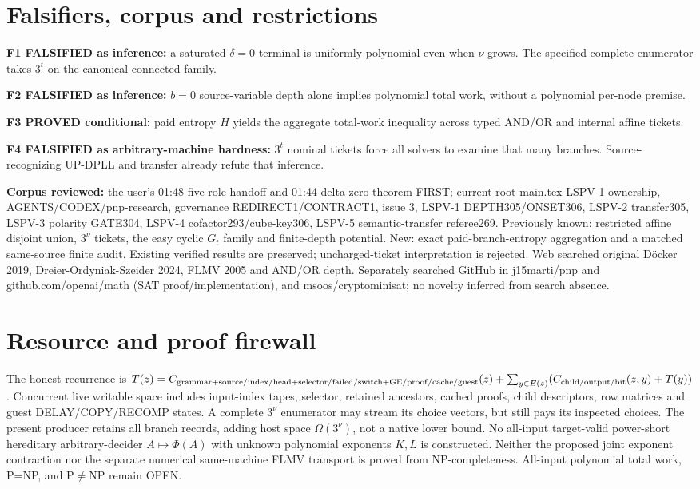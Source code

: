 \documentclass[11pt]{article}
\begin{document}
\section{Falsifiers, corpus and restrictions}
\noindent\textbf{F1 FALSIFIED as inference:} a saturated $\delta=0$ terminal is uniformly polynomial even when $\nu$ grows. The specified complete enumerator takes $3^t$ on the canonical connected family.
\par\noindent\textbf{F2 FALSIFIED as inference:} $b=0$ source-variable depth alone implies polynomial total work, without a polynomial per-node premise.
\par\noindent\textbf{F3 PROVED conditional:} paid entropy $H$ yields the aggregate total-work inequality across typed AND/OR and internal affine tickets.
\par\noindent\textbf{F4 FALSIFIED as arbitrary-machine hardness:} $3^t$ nominal tickets force all solvers to examine that many branches. Source-recognizing UP-DPLL and transfer already refute that inference.

\noindent\textbf{Corpus reviewed:} the user's 01:48 five-role handoff and 01:44 delta-zero theorem FIRST; current root main.tex LSPV-1 ownership, AGENTS/CODEX/pnp-research, governance REDIRECT1/CONTRACT1, issue 3, LSPV-1 DEPTH305/ONSET306, LSPV-2 transfer305, LSPV-3 polarity GATE304, LSPV-4 cofactor293/cube-key306, LSPV-5 semantic-transfer referee269. Previously known: restricted affine disjoint union, $3^\nu$ tickets, the easy cyclic $G_t$ family and finite-depth potential. New: exact paid-branch-entropy aggregation and a matched same-source finite audit. Existing verified results are preserved; uncharged-ticket interpretation is rejected. Web searched original D\"ocker 2019, Dreier-Ordyniak-Szeider 2024, FLMV 2005 and AND/OR depth. Separately searched GitHub in j15marti/pnp and github.com/openai/math (SAT proof/implementation), and msoos/cryptominisat; no novelty inferred from search absence.

\section{Resource and proof firewall}
The honest recurrence is $T(z)=C_{\rm grammar+source/index/head+selector/failed/switch+GE/proof/cache/guest}(z)+\sum_{y\in E(z)}(C_{\rm child/output/bit}(z,y)+T(y))$. Concurrent live writable space includes input-index tapes, selector, retained ancestors, cached proofs, child descriptors, row matrices and guest DELAY/COPY/RECOMP states. A complete $3^\nu$ enumerator may stream its choice vectors, but still pays its inspected choices. The present producer retains all branch records, adding host space $\Omega(3^\nu)$, not a native lower bound. No all-input target-valid power-short hereditary arbitrary-decider $A\mapsto\Phi(A)$ with unknown polynomial exponents $K,L$ is constructed. Neither the proposed joint exponent contraction nor the separate numerical same-machine FLMV transport is proved from NP-completeness. All-input polynomial total work, P=NP, and P$\ne$NP remain OPEN.
\end{document}
